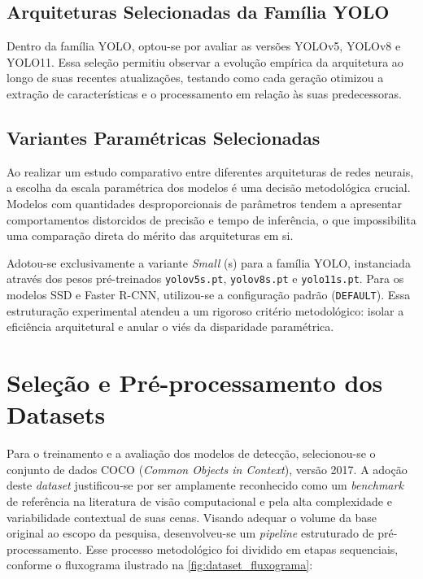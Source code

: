\subsection{Arquiteturas Selecionadas da Família YOLO}

Dentro da família YOLO, optou-se por avaliar as versões YOLOv5, YOLOv8 e YOLO11. Essa seleção
permitiu observar a evolução empírica da arquitetura ao longo de suas recentes atualizações,
testando como cada geração otimizou a extração de características e o processamento em relação
às suas predecessoras.

\subsection{Variantes Paramétricas Selecionadas}

Ao realizar um estudo comparativo entre diferentes arquiteturas de redes neurais, a escolha da
escala paramétrica dos modelos é uma decisão metodológica crucial. Modelos com quantidades
desproporcionais de parâmetros tendem a apresentar comportamentos distorcidos de precisão e
tempo de inferência, o que impossibilita uma comparação direta do mérito das arquiteturas em
si.

Adotou-se exclusivamente a variante \textit{Small} (s) para a família YOLO, instanciada
através dos pesos pré-treinados \texttt{yolov5s.pt}, \texttt{yolov8s.pt} e
\texttt{yolo11s.pt}. Para os modelos SSD e Faster R-CNN, utilizou-se a configuração padrão
(\texttt{DEFAULT}). Essa estruturação experimental atendeu a um rigoroso critério
metodológico: isolar a eficiência arquitetural e anular o viés da disparidade paramétrica.

\section{Seleção e Pré-processamento dos Datasets}

Para o treinamento e a avaliação dos modelos de detecção, selecionou-se o conjunto de dados
COCO (\textit{Common Objects in Context}), versão 2017.
A adoção deste \textit{dataset} justificou-se por ser amplamente reconhecido como um
\textit{benchmark} de referência na literatura de visão computacional e pela alta
complexidade e variabilidade contextual de suas cenas.
Visando adequar o volume da base original ao escopo da pesquisa, desenvolveu-se um
\textit{pipeline} estruturado de pré-processamento.
Esse processo metodológico foi dividido em etapas sequenciais, conforme o fluxograma
ilustrado na \autoref{fig:dataset_fluxograma}:

